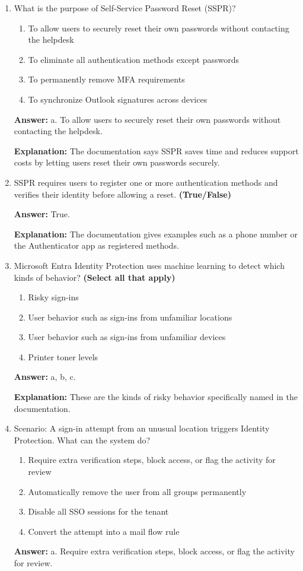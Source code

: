 \documentclass[10pt]{article}
\begin{document}
\begin{enumerate}[leftmargin=*]
\textbf{Explanation:} The documentation uses this example to illustrate MFA for sensitive access from a new device.

\item What is the purpose of Self-Service Password Reset (SSPR)?
\begin{enumerate}[label=\alph*., leftmargin=1.5em]
\item To allow users to securely reset their own passwords without contacting the helpdesk
\item To eliminate all authentication methods except passwords
\item To permanently remove MFA requirements
\item To synchronize Outlook signatures across devices
\end{enumerate}
\textbf{Answer:} a. To allow users to securely reset their own passwords without contacting the helpdesk.

\textbf{Explanation:} The documentation says SSPR saves time and reduces support costs by letting users reset their own passwords securely.

\item SSPR requires users to register one or more authentication methods and verifies their identity before allowing a reset. \textbf{(True/False)}

\textbf{Answer:} True.

\textbf{Explanation:} The documentation gives examples such as a phone number or the Authenticator app as registered methods.

\item Microsoft Entra Identity Protection uses machine learning to detect which kinds of behavior? \textbf{(Select all that apply)}
\begin{enumerate}[label=\alph*., leftmargin=1.5em]
\item Risky sign-ins
\item User behavior such as sign-ins from unfamiliar locations
\item User behavior such as sign-ins from unfamiliar devices
\item Printer toner levels
\end{enumerate}
\textbf{Answer:} a, b, c.

\textbf{Explanation:} These are the kinds of risky behavior specifically named in the documentation.

\item Scenario: A sign-in attempt from an unusual location triggers Identity Protection. What can the system do?
\begin{enumerate}[label=\alph*., leftmargin=1.5em]
\item Require extra verification steps, block access, or flag the activity for review
\item Automatically remove the user from all groups permanently
\item Disable all SSO sessions for the tenant
\item Convert the attempt into a mail flow rule
\end{enumerate}
\textbf{Answer:} a. Require extra verification steps, block access, or flag the activity for review.


\end{enumerate}
\end{document}
